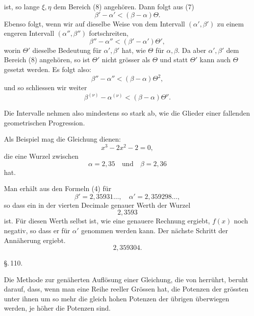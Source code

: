 ist, so lange $\xi, \eta$ dem Bereich (8) angehören. Dann folgt aus (7)
\[
\beta' - \alpha' < (\beta - \alpha)\Theta.
\]
Ebenso folgt, wenn wir auf dieselbe Weise von dem Intervall $(\alpha', \beta')$ zu einem engeren Intervall $(\alpha'', \beta'')$ fortschreiten,
\[
\beta'' - \alpha'' < (\beta' - \alpha')\Theta',
\]
worin $\Theta'$ dieselbe Bedeutung für $\alpha', \beta'$ hat, wie $\Theta$ für $\alpha, \beta$. Da aber $\alpha', \beta'$ dem Bereich (8) angehören, so ist $\Theta'$ nicht grösser als $\Theta$ und statt $\Theta'$ kann auch $\Theta$ gesetzt werden. Es folgt also:
\[
\beta'' - \alpha'' < (\beta - \alpha)\Theta^2,
\]
und so schliessen wir weiter
\[
\beta^{(\nu)} - \alpha^{(\nu)} < (\beta - \alpha)\Theta^\nu.
\]

Die Intervalle nehmen also mindestens so stark ab, wie die Glieder einer fallenden geometrischen Progression.

Als Beispiel mag die Gleichung dienen:
\[
x^3 - 2x^2 - 2 = 0,
\]
die eine Wurzel zwischen
\[
\alpha = 2{,}35 \quad \text{und} \quad \beta = 2{,}36
\]
hat.

Man erhält aus den Formeln (4) für
\[
\beta' = 2{,}35931\ldots, \quad \alpha' = 2{,}359298\ldots,
\]
so dass ein in der vierten Decimale genauer Werth der Wurzel
\[
2{,}3593
\]
ist. Für diesen Werth selbst ist, wie eine genauere Rechnung ergiebt, $f(x)$ noch negativ, so dass er für $\alpha'$ genommen werden kann. Der nächste Schritt der Annäherung ergiebt.
\[
2{,}359304.
\]

\begin{center}
\S.\,110.

\end{center}

Die Methode zur genäherten Auflösung einer Gleichung, die von  herrührt, beruht darauf, dass, wenn man eine Reihe reeller Grössen hat, die Potenzen der grössten unter ihnen um so mehr die gleich hohen Potenzen der übrigen überwiegen werden, je höher die Potenzen sind.
